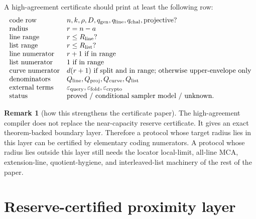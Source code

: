 \documentclass[11pt]{article}
\theoremstyle{definition}
\newtheorem{remark}[theorem]{Remark}
\newcommand{\eps}{\varepsilon}
\newcommand{\qgen}{q_{\rm gen}}
\newcommand{\qchal}{q_{\rm chal}}
\newcommand{\qline}{q_{\rm line}}
\begin{document}
A high-agreement certificate should print at least the following row:
\[
\begin{array}{ll}
\text{code row} & n,k,\rho,D,\qgen,\qline,\qchal,\text{projective?}\\
\text{radius} & r=n-a\\
\text{line range} & r\le R_{\mathrm{line}}\text{?}\\
\text{list range} & r\le R_{\mathrm{list}}\text{?}\\
\text{line numerator} & r+1\text{ if in range}\\
\text{list numerator} & 1\text{ if in range}\\
\text{curve numerator} & d(r+1)\text{ if split and in range; otherwise upper-envelope only}\\
\text{denominators} & Q_{\mathrm{line}},Q_{\mathrm{proj}},Q_{\mathrm{curve}},Q_{\mathrm{list}}\\
\text{external terms} & \eps_{\mathrm{query}},\eps_{\mathrm{fold}},\eps_{\mathrm{crypto}}\\
\text{status} & \text{proved / conditional sampler model / unknown.}
\end{array}
\]

\begin{remark}[how this strengthens the certificate paper]
The high-agreement compiler does not replace the near-capacity reserve
certificate.  It gives an exact theorem-backed boundary layer.  Therefore a
protocol whose target radius lies in this layer can be certified by elementary
coding numerators.  A protocol whose radius lies outside this layer still needs
the locator local-limit, all-line MCA, extension-line, quotient-hygiene, and
interleaved-list machinery of the rest of the paper.
\end{remark}


\section{Reserve-certified proximity layer}
\label{sec:construction}
\end{document}
